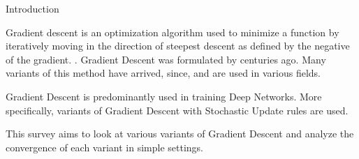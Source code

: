 \documentclass{article}
\begin{document}
\begin{psection}{Introduction}

	Gradient descent is an optimization algorithm used to minimize a function by iteratively moving in the direction of steepest descent as defined by the negative of the gradient. \citep{gd-overview}. Gradient Descent was formulated by \cite{gd-original} centuries ago. Many variants of this method have arrived, since, and are used in various fields.

	Gradient Descent is predominantly used in training Deep Networks. More specifically, variants of Gradient Descent with Stochastic Update rules are used.

	This survey aims to look at various variants of Gradient Descent and analyze the convergence of each variant in simple settings.

\end{psection}
\end{document}
